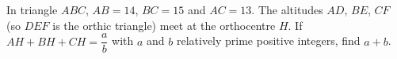 In triangle $ABC$, $AB=14$, $BC=15$ and $AC=13$. The altitudes $AD$, $BE$, $CF$ (so $DEF$ is the orthic triangle) meet at the orthocentre $H$. If $AH+BH+CH=\dfrac {a}{b}$ with $a$ and $b$ relatively prime positive integers, find $a+b$.
